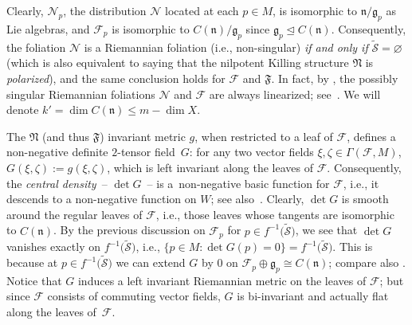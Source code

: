 \documentclass[10pt,a4paper]{amsart}
\numberwithin{equation}{section}
\begin{document}
Clearly, $\mathcal{N}_p$, the distribution $\mathcal{N}$ located at each $p\in
M$, is isomorphic to $\mathfrak{n}\slash \mathfrak{g}_p$ as Lie algebras, and
$\mathcal{F}_p$ is isomorphic to $C(\mathfrak{n})\slash \mathfrak{g}_p$ since
$\mathfrak{g}_p\trianglelefteq C(\mathfrak{n})$. Consequently, the foliation
$\mathcal{N}$ is a Riemannian foliation (i.e., non-singular) \emph{if and only
if} $\tilde{\mathcal{S}}=\varnothing$ (which is also equivalent to saying that the
nilpotent Killing structure $\mathfrak{N}$ is \emph{polarized}), and the same
conclusion holds for $\mathcal{F}$ and $\mathfrak{F}$. In fact, by
\cite[Theorem~0.5]{Fukaya88}, the possibly singular Riemannian foliations
$\mathcal{N}$ and $\mathcal{F}$ are always linearized; see~\cite{Molino88}. We
will denote $k'=\dim C(\mathfrak{n})\le m-\dim X$.

The $\mathfrak{N}$ (and thus $\mathfrak{F}$) invariant metric $g$, when
restricted to a leaf of $\mathcal{F}$, defines a non-negative definite
$2$-tensor field~$G$: for any two vector fields $\xi,\zeta \in
\Gamma(\mathcal{F},M)$, $G(\xi,\zeta):=g(\xi,\zeta)$, which is left
invariant along the leaves of $\mathcal{F}$. Consequently, the \emph{central
density}~-- $\det G$~-- is a~non-negative basic function for $\mathcal{F}$,
i.e., it descends to a non-negative function on $W$; see also~\cite{Foxy1908}.
Clearly, $\det G$ is smooth around the regular leaves of $\mathcal{F}$, i.e.,
those leaves whose tangents are isomorphic to $C(\mathfrak{n})$. By the
previous discussion on $\mathcal{F}_p$ for $p\in f^{-1}\big(\tilde{\mathcal{S}}\big)$,
we see that $\det G$ vanishes exactly on $f^{-1}\big(\tilde{\mathcal{S}}\big)$, i.e.,
$ \{p\in M\colon \det G(p)=0 \}=f^{-1}\big(\tilde{\mathcal{S}}\big)$. This is
because at $p\in f^{-1}\big(\tilde{\mathcal{S}}\big)$ we can extend $G$ by $0$ on
$\mathcal{F}_p\oplus \mathfrak{g}_p\cong C(\mathfrak{n})$; compare also
\cite[Theorem~0.6]{Fukaya87mGH}. Notice that $G$ induces a left invariant
Riemannian metric on the leaves of $\mathcal{F}$; but since $\mathcal{F}$
consists of commuting vector fields, $G$ is bi-invariant and actually flat
along the leaves of~$\mathcal{F}$.
\end{document}

